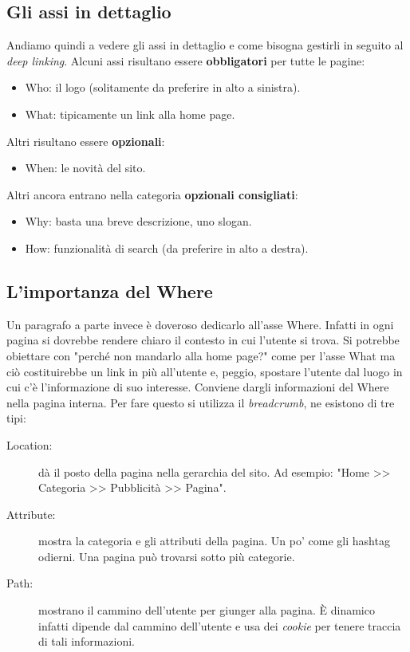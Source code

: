 		\subsection{Gli assi in dettaglio}
			Andiamo quindi a vedere gli assi in dettaglio e come bisogna gestirli in seguito al \emph{deep linking}.
			Alcuni assi risultano essere \textbf{obbligatori} per tutte le pagine:
			\begin{itemize}
				\item Who: il logo (solitamente da preferire in alto a sinistra).
				\item What: tipicamente un link alla home page.
			\end{itemize}
			Altri risultano essere \textbf{opzionali}:
			\begin{itemize}
				\item When: le novità del sito.
			\end{itemize}
			Altri ancora entrano nella categoria \textbf{opzionali consigliati}:
			\begin{itemize}
				\item Why: basta una breve descrizione, uno slogan.
				\item How: funzionalità di search (da preferire in alto a destra).
			\end{itemize}
		
		\subsection{L'importanza del Where}
			Un paragrafo a parte invece è doveroso dedicarlo all'asse Where. Infatti in ogni pagina si dovrebbe rendere chiaro il contesto in cui l'utente si trova. Si potrebbe obiettare con "perché non mandarlo alla home page?" come per l'asse What ma ciò costituirebbe un link in più all'utente e, peggio, spostare l'utente dal luogo in cui c'è l'informazione di suo interesse. Conviene dargli informazioni del Where nella pagina interna.
				Per fare questo si utilizza il \emph{breadcrumb}, ne esistono di tre tipi:
				\begin{description}
					\item[Location:] dà il posto della pagina nella gerarchia del sito. Ad esempio: "Home >> Categoria >> Pubblicità >> Pagina".
					\item[Attribute:] mostra la categoria e gli attributi della pagina. Un po' come gli hashtag odierni. Una pagina può trovarsi sotto più categorie.
					\item[Path:] mostrano il cammino dell'utente per giunger alla pagina. È dinamico infatti dipende dal cammino dell'utente e usa dei \emph{cookie} per tenere traccia di tali informazioni.
				\end{description}
				

